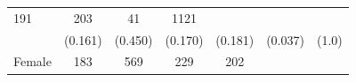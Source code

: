 \documentclass[11pt,a4paper,openany]{book}
\begin{document}
\begin{longtable}[]{@{}lcccccr@{}}
\begin{minipage}[t]{0.11\columnwidth}
191\strut
\end{minipage} & \begin{minipage}[t]{0.08\columnwidth}\centering\strut
203\strut
\end{minipage} & \begin{minipage}[t]{0.08\columnwidth}\centering\strut
41\strut
\end{minipage} & \begin{minipage}[t]{0.05\columnwidth}\raggedleft\strut
1121\strut
\end{minipage}\tabularnewline
\begin{minipage}[t]{0.33\columnwidth}\raggedright\strut
\strut
\end{minipage} & \begin{minipage}[t]{0.08\columnwidth}\centering\strut
(0.161)\strut
\end{minipage} & \begin{minipage}[t]{0.07\columnwidth}\centering\strut
(0.450)\strut
\end{minipage} & \begin{minipage}[t]{0.11\columnwidth}\centering\strut
(0.170)\strut
\end{minipage} & \begin{minipage}[t]{0.08\columnwidth}\centering\strut
(0.181)\strut
\end{minipage} & \begin{minipage}[t]{0.08\columnwidth}\centering\strut
(0.037)\strut
\end{minipage} & \begin{minipage}[t]{0.05\columnwidth}\raggedleft\strut
(1.0)\strut
\end{minipage}\tabularnewline
\begin{minipage}[t]{0.33\columnwidth}\raggedright\strut
Female\strut
\end{minipage} & \begin{minipage}[t]{0.08\columnwidth}\centering\strut
183\strut
\end{minipage} & \begin{minipage}[t]{0.07\columnwidth}\centering\strut
569\strut
\end{minipage} & \begin{minipage}[t]{0.11\columnwidth}\centering\strut
229\strut
\end{minipage} & \begin{minipage}[t]{0.08\columnwidth}\centering\strut
202\strut
\end{minipage} & \begin{minipage}[t]{0.08\columnwidth}\centering\strut

\end{minipage}
\end{longtable}
\end{document}
